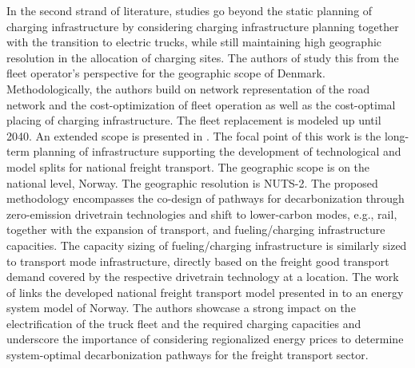 \documentclass[preprint,10pt,review, authoryear]{elsarticle}
\begin{document}
    In the second strand of literature, studies go beyond the static planning of charging infrastructure by considering charging infrastructure planning together with the transition to electric trucks, while still maintaining high geographic resolution in the allocation of charging sites. The authors of \citep{KARAM2025101413} study this from the fleet operator's perspective for the geographic scope of Denmark. Methodologically, the authors build on network representation of the road network and the cost-optimization of fleet operation as well as the cost-optimal placing of charging infrastructure. The fleet replacement is modeled up until 2040. An extended scope is presented in \citep{bakker2023stram}. The focal point of this work is the long-term planning of infrastructure supporting the development of technological and model splits for national freight transport. The geographic scope is on the national level, Norway. The geographic resolution is NUTS-2. The proposed methodology encompasses the co-design of pathways for decarbonization through zero-emission drivetrain technologies and shift to lower-carbon modes, e.g., rail, together with the expansion of transport, and fueling/charging infrastructure capacities. The capacity sizing of fueling/charging infrastructure is similarly sized to transport mode infrastructure, directly based on the freight good transport demand covered by the respective drivetrain technology at a location. The work of \cite{PAGNIER2026105114} links the developed national freight transport model presented in \citep{bakker2023stram} to an energy system model of Norway. The authors showcase a strong impact on the electrification of the truck fleet and the required charging capacities and underscore the importance of considering regionalized energy prices to determine system-optimal decarbonization pathways for the freight transport sector.
\end{document}
